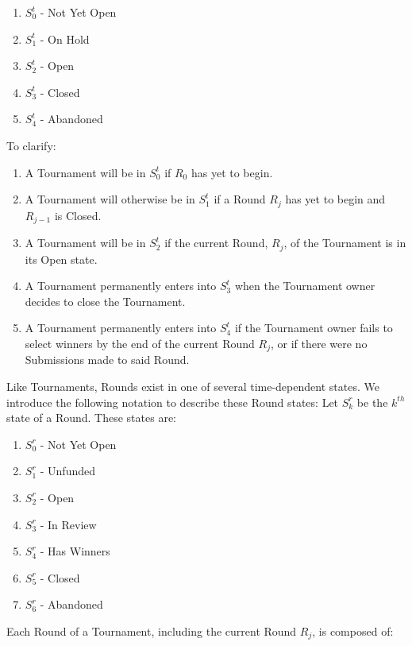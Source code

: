 \documentclass[a4paper, 10pt, conference]{ieeeconf}      %
\begin{document}
\begin{enumerate}
\item $S_{0}^t$ - Not Yet Open
\item $S_{1}^t$ - On Hold
\item $S_{2}^t$ - Open
\item $S_{3}^t$ - Closed
\item $S_{4}^t$ - Abandoned
\end{enumerate}
\bigskip

To clarify: 

\begin{enumerate}
\item A Tournament will be in $S_{0}^t$ if $R_0$ has yet to begin.
\item A Tournament will otherwise be in $S_{1}^t$ if a Round $R_j$ has yet to begin and $R_{j-1}$ is Closed.
\item A Tournament will be in $S_{2}^t$ if the current Round, $R_j$, of the Tournament is in its Open state.
\item A Tournament permanently enters into $S_{3}^t$ when the Tournament owner decides to close the Tournament.
\item A Tournament permanently enters into $S_{4}^t$ if the Tournament owner fails to select winners by the end of the current Round $R_j$, or if there were no Submissions made to said Round.
\end{enumerate}

Like Tournaments, Rounds exist in one of several time-dependent states. We introduce the following notation to describe these Round states: Let $S_k^r$ be the $k^{th}$ state of a Round. These states are:

\begin{enumerate}
\item $S_{0}^r$ - Not Yet Open
\item $S_{1}^r$ - Unfunded
\item $S_{2}^r$ - Open
\item $S_{3}^r$ - In Review
\item $S_{4}^r$ - Has Winners
\item $S_{5}^r$ - Closed
\item $S_{6}^r$ - Abandoned
\end{enumerate}
\vspace{4pt}

Each Round of a Tournament, including the current Round $R_j$, is composed of:
\end{document}
